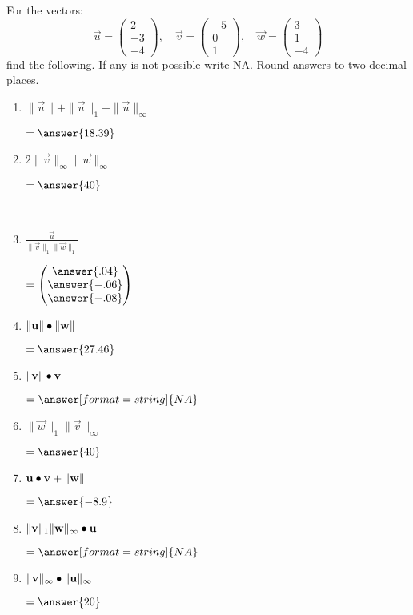 \documentclass{ximera}
\author{Parisa Fatheddin}
\begin{document}
\begin{exercise}
For the vectors:
\[\vec{u}= \begin{pmatrix}
2\\
-3\\
-4
\end{pmatrix}, \quad \vec{v} = \begin{pmatrix} -5\\ 0\\ 1 \end{pmatrix}, \quad 
\vec{w} = \begin{pmatrix} 3 \\ 1 \\ -4 \end{pmatrix}\]
find the following. If any is not possible write NA. Round answers to two decimal places.
\begin{enumerate}
\item $\|\vec{u}\| + \|\vec{u}\|_{1} + \|\vec{u}\|_{\infty}$
\begin{prompt}
$=\answer{18.39}$
\end{prompt}
\item $2 \|\vec{v}\|_{\infty} \|\vec{w}\|_{\infty}$
\begin{prompt}
$=\answer{40}$
\end{prompt}\\
\item $\frac{\vec{u}}{\|\vec{v}\|_{1} \|\vec{w}\|_{1}}$
\begin{prompt}
$=\begin{pmatrix} \answer{.04} \\
\answer{-.06} \\
\answer{-.08}
\end{pmatrix}$
\end{prompt}
\item $\|\mathbf{u}\| \bullet \|\mathbf{w}\|$
\begin{prompt}
$=\answer{27.46}$
\end{prompt} 
\item $\|\mathbf{v}\| \bullet \mathbf{v}$
\begin{prompt}
$=\answer[format=string]{NA}$
\end{prompt}
\item $\|\vec{w}\|_{1} \|\vec{v}\|_{\infty}$
\begin{prompt}
$=\answer{40}$
\end{prompt}
\item $\mathbf{u} \bullet \mathbf{v} + \|\mathbf{w}\|$
\begin{prompt}
$=\answer{-8.9}$
\end{prompt} 
\item $\|\mathbf{v}\|_{1} \|\mathbf{w}\|_{\infty} \bullet \mathbf{u}$
\begin{prompt}
$=\answer[format=string]{NA}$
\end{prompt}
\item $\|\mathbf{v}\|_{\infty} \bullet \|\mathbf{u}\|_{\infty}$
\begin{prompt}
$=\answer{20}$
\end{prompt}
    \pdfOnly{\end{multicols}}
\end{enumerate}
\end{exercise}
\end{document}
